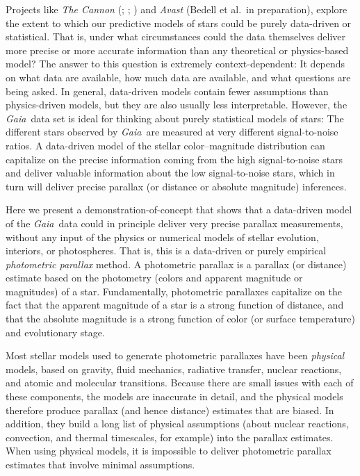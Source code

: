 \documentclass[modern]{aastex61}
\newcommand{\project}[1]{\textsl{#1}}
\newcommand{\gaia}{\project{Gaia}}
\begin{document}
Projects like \project{The Cannon} (\citealt{ness15}; \citealt{casey17}; \citealt{ho17})
and \project{Avast} (Bedell et al.\ in preparation),
explore the extent to which our predictive models of
stars could be purely data-driven or statistical.
That is, under what circumstances could the data themselves deliver
more precise or more accurate information than any theoretical or
physics-based model?
The answer to this question is extremely context-dependent: It depends
on what data are available, how much data are available, and what
questions are being asked.
In general, data-driven models contain fewer assumptions than
physics-driven models, but they are also usually less interpretable.
However, the \gaia\ data set is ideal for thinking about purely statistical
models of stars:
The different stars observed by \gaia\ are measured at very different
signal-to-noise ratios.
A data-driven model of the stellar color--magnitude distribution can capitalize
on the precise information coming from the high signal-to-noise stars
and deliver valuable information about the low signal-to-noise stars,
which in turn will deliver precise parallax (or distance or absolute magnitude) inferences.

Here we present a demonstration-of-concept that shows that a
data-driven model of the \gaia\ data could in principle deliver very
precise parallax measurements, without any input of the physics or numerical models of stellar
evolution, interiors, or photospheres.
That is, this is a data-driven or purely empirical \emph{photometric
  parallax} method.
A photometric parallax is a parallax (or distance) estimate based on
the photometry (colors and apparent magnitude or magnitudes) of a
star.
Fundamentally, photometric parallaxes capitalize on the fact that the
apparent magnitude of a star is a strong function of distance, and
that the absolute magnitude is a strong function of color (or surface
temperature) and evolutionary stage.

Most stellar models used to generate photometric
parallaxes have been \emph{physical} models, based on gravity, fluid mechanics,
radiative transfer, nuclear reactions, and atomic and molecular transitions.
Because there are small issues with each of these components, the models are inaccurate in detail, and
the physical models therefore produce parallax (and hence distance) estimates that are biased.
In addition, they build a long list of physical assumptions (about
nuclear reactions, convection, and thermal timescales, for example)
into the parallax estimates.
When using physical models, it is impossible to deliver photometric parallax estimates that involve minimal assumptions.
\end{document}
